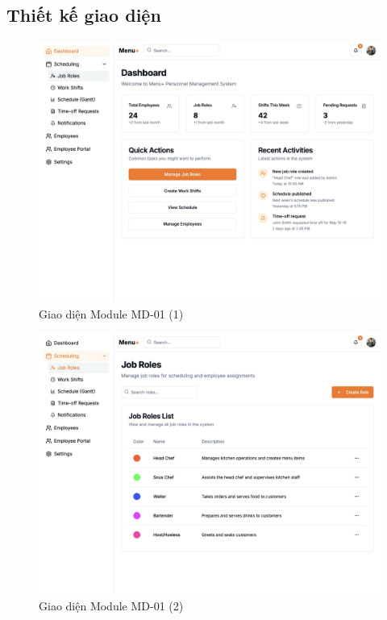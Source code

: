 \subsection{Thiết kế giao diện}

\begin{figure}[H]
    \centering
    \includegraphics[width=\linewidth]{Sections/hien_thuc/img/1.1.png}
    \vspace{0.5cm}
    \caption{Giao diện Module MD-01 (1)}
    \label{fig:gantt_module_md01_1}
\end{figure}

\begin{figure}[H]
    \centering
    \includegraphics[width=\linewidth]{Sections/hien_thuc/img/1.2.png}
    \vspace{0.5cm}
    \caption{Giao diện Module MD-01 (2)}
    \label{fig:gantt_module_md01_2}
\end{figure}

